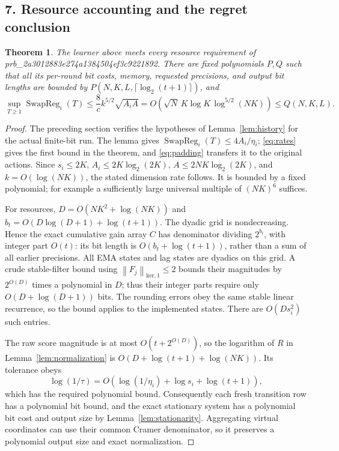 \documentclass[11pt]{article}
\newcommand{\SwapReg}{\operatorname{SwapReg}}
\newcommand{\norm}[1]{\left\lVert#1\right\rVert}
\newtheorem{theorem}{Theorem}
\begin{document}
\subsection*{7. Resource accounting and the regret conclusion}
\begin{theorem}\label{thm:transfer}
The learner above meets every resource requirement of prb_2a3012883e274a1384504ef3c9221892.
There are fixed polynomials $P,Q$
such that all its per-round bit costs, memory, requested precisions,
and output bit lengths are bounded by
$P(N,K,L,\lceil\log_2(t+1)\rceil)$, and
\[
 \sup_{T\geq1}\SwapReg_i(T)
 \leq\frac{8}{c}k^{5/2}\sqrt{A_iA}
 =O\!\left(\sqrt N\,K\log K\,\log^{5/2}(NK)\right)
 \leq Q(N,K,L).
\]
\end{theorem}
\begin{proof}
The preceding section verifies the hypotheses of Lemma~\ref{lem:history}
for the actual finite-bit run.  The lemma gives
$\SwapReg_i(T)\leq4A_i/\eta_i$;
\eqref{eq:rates} gives the first bound in the theorem, and
\eqref{eq:padding} transfers it to the original actions.
Since $s_i\leq2K$, $A_i\leq2K\log_2(2K)$,
$A\leq2NK\log_2(2K)$, and $k=O(\log(NK))$, the stated dimension
rate follows.  It is bounded by a fixed polynomial; for example a
sufficiently large universal multiple of $(NK)^6$ suffices.

For resources, $D=O(NK^2+\log(NK))$ and
$b_t=O(D\log(D+1)+\log(t+1))$.
The dyadic grid is nondecreasing.  Hence the exact cumulative gain
array $C$ has denominator dividing $2^{b_t}$, with integer part
$O(t)$: its bit length is $O(b_t+\log(t+1))$, rather than a sum of
all earlier precisions.  All EMA states and lag states are dyadics
on this grid.  A crude stable-filter bound using
$\norm{F_j}_{\mathrm{ker},1}\leq2$ bounds their magnitudes by
$2^{O(D)}$ times a polynomial in $D$; thus their integer parts require
only $O(D+\log(D+1))$ bits.  The rounding errors obey the same stable
linear recurrence, so the bound applies to the implemented states.
There are $O(Ds_i^2)$ such entries.

The raw score magnitude is at most $O(t+2^{O(D)})$, so the logarithm
of $R$ in Lemma~\ref{lem:normalization} is
$O(D+\log(t+1)+\log(NK))$.  Its tolerance obeys
\[
 \log(1/\tau)=O(\log(1/\eta_i)+\log s_i+\log(t+1)),
\]
which has the required polynomial bound.  Consequently each fresh
transition row has a polynomial bit bound, and the exact stationary
system has a polynomial bit cost and output size by
Lemma~\ref{lem:stationarity}.  Aggregating virtual coordinates can
use their common Cramer denominator, so it preserves a polynomial
output size and exact normalization.


\end{proof}
\end{document}
